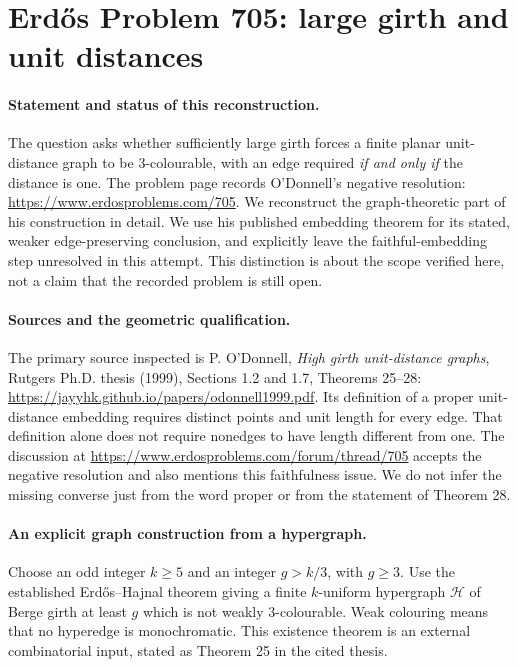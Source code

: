 \section*{Erd\H{o}s Problem 705: large girth and unit distances}

\paragraph{Statement and status of this reconstruction.}
The question asks whether sufficiently large girth forces a
finite planar unit-distance graph to be \(3\)-colourable,
with an edge required \emph{if and only if} the distance is one.
The problem page records O'Donnell's negative resolution:
\url{https://www.erdosproblems.com/705}.
We reconstruct the graph-theoretic part of his construction
in detail. We use his published embedding theorem for its
stated, weaker edge-preserving conclusion, and explicitly
leave the faithful-embedding step unresolved in this attempt.
This distinction is about the scope verified here, not a
claim that the recorded problem is still open.

\paragraph{Sources and the geometric qualification.}
The primary source inspected is P. O'Donnell,
\emph{High girth unit-distance graphs}, Rutgers Ph.D. thesis
(1999), Sections 1.2 and 1.7, Theorems 25--28:
\url{https://jayyhk.github.io/papers/odonnell1999.pdf}.
Its definition of a proper unit-distance embedding requires
distinct points and unit length for every edge.
That definition alone does not require nonedges to have
length different from one. The discussion at
\url{https://www.erdosproblems.com/forum/thread/705}
accepts the negative resolution and also mentions this
faithfulness issue.
We do not infer the missing converse just from the word
proper or from the statement of Theorem 28.

\paragraph{An explicit graph construction from a hypergraph.}
Choose an odd integer \(k\geq5\) and an integer \(g>k/3\),
with \(g\geq3\).
Use the established Erd\H{o}s--Hajnal theorem giving a finite
\(k\)-uniform hypergraph \(\mathcal H\) of Berge girth at
least \(g\) which is not weakly \(3\)-colourable.
Weak colouring means that no hyperedge is monochromatic.
This existence theorem is an external combinatorial input,
stated as Theorem 25 in the cited thesis.

